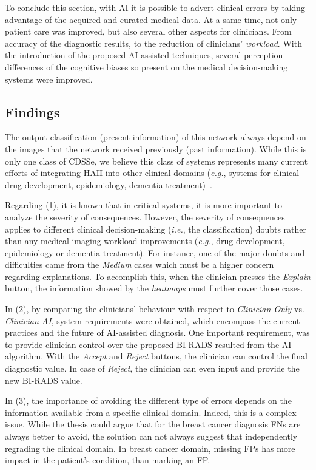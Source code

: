 To conclude this section, with \ac{AI} it is possible to advert clinical errors by taking advantage of the acquired and curated medical data.
At a same time, not only patient care was improved, but also several other aspects for clinicians.
From accuracy of the diagnostic results, to the reduction of clinicians' {\it workload}.
With the introduction of the proposed \ac{AI}-assisted techniques, several perception differences of the cognitive biases so present on the medical decision-making systems were improved.

\subsection{Findings}
\label{sec:app002007003}

The output classification (present information) of this network always depend on the images that the network received previously (past information).
While this is only one class of \ac{CDSSe}, we believe this class of systems represents many current efforts of integrating \ac{HAII} into other clinical domains ({\it e.g.}, systems for clinical drug development, epidemiology, dementia treatment)~\cite{Savage2019, shah2019artificial, topol2019high}.

Regarding (1), it is known that in critical systems, it is more important to analyze the severity of consequences.
However, the severity of consequences applies to different clinical decision-making ({\it i.e.}, the classification) doubts rather than any medical imaging workload improvements ({\it e.g.}, drug development, epidemiology or dementia treatment).
For instance, one of the major doubts and difficulties came from the {\it Medium} cases which must be a higher concern regarding explanations.
To accomplish this, when the clinician presses the {\it Explain} button, the information showed by the {\it heatmaps} must further cover those cases.

In (2), by comparing the clinicians' behaviour with respect to {\it Clinician-Only} vs. {\it Clinician-AI}, system requirements were obtained, which encompass the current practices and the future of \ac{AI}-assisted diagnosis.
One important requirement, was to provide clinician control over the proposed \ac{BI-RADS} resulted from the \ac{AI} algorithm.
With the {\it Accept} and {\it Reject} buttons, the clinician can control the final diagnostic value.
In case of {\it Reject}, the clinician can even input and provide the new \ac{BI-RADS} value.

In (3), the importance of avoiding the different type of errors depends on the information available from a specific clinical domain.
Indeed, this is a complex issue.
While the thesis could argue that for the breast cancer diagnosis \acp{FN} are always better to avoid, the solution can not always suggest that independently regrading the clinical domain.
In breast cancer domain, missing \acp{FP} has more impact in the patient's condition, than marking an \ac{FP}.  

